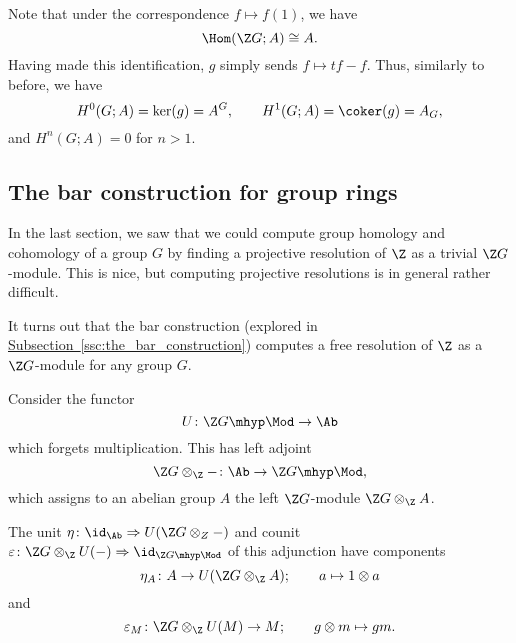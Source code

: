 \documentclass[main.tex]{subfiles}
\begin{document}
\begin{example}
  Note that under the correspondence $f \mapsto f(1)$, we have
  \begin{equation*}
    \Hom(\Z G; A) \cong A.
  \end{equation*}
  Having made this identification, $g$ simply sends $f \mapsto tf - f$. Thus, similarly to before, we have
  \begin{equation*}
    H^{0}(G; A) = \ker(g) = A^{G},\qquad H^{1}(G; A) = \coker(g) = A_{G},
  \end{equation*}
  and $H^{n}(G; A) = 0$ for $n > 1$.
\end{example}


\subsection{The bar construction for group rings}
\label{ssc:the_bar_construction_for_group_rings}

In the last section, we saw that we could compute group homology and cohomology of a group $G$ by finding a projective resolution of $\Z$ as a trivial $\Z G$-module. This is nice, but computing projective resolutions is in general rather difficult.

It turns out that the bar construction (explored in \hyperref[ssc:the_bar_construction]{Subsection~\ref*{ssc:the_bar_construction}}) computes a free resolution of $\Z$ as a $\Z G$-module for any group $G$.

Consider the functor
\begin{equation*}
  U\colon \Z G\mhyp\Mod \to \Ab
\end{equation*}
which forgets multiplication. This has left adjoint
\begin{equation*}
  \Z G \otimes_{\Z} -\colon \Ab \to \Z G\mhyp\Mod,
\end{equation*}
which assigns to an abelian group $A$ the left $\Z G$-module $\Z G \otimes_{\Z} A$.

The unit $\eta\colon \id_{\Ab} \Rightarrow U(\Z G \otimes_{Z} -)$ and counit $\varepsilon\colon \Z G \otimes_{\Z} U(-) \Rightarrow \id_{\Z G \mhyp\Mod}$ of this adjunction have components
\begin{equation*}
  \eta_{A}\colon A \to U(\Z G \otimes_{\Z} A);\qquad a \mapsto 1 \otimes a
\end{equation*}
and
\begin{equation*}
  \varepsilon_{M}\colon \Z G \otimes_{\Z} U(M) \to M;\qquad g \otimes m \mapsto gm.
\end{equation*}
\end{document}
